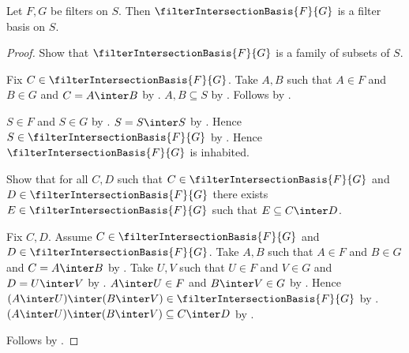 \begin{proposition}\label{filter_intersection_basis_is_filter_basis}
    Let $F,G$ be filters on $S$.
    Then $\filterIntersectionBasis{F}{G}$ is a filter basis on $S$.
\end{proposition}
\begin{proof}
    Show that $\filterIntersectionBasis{F}{G}$ is a family of subsets of $S$.
    \begin{subproof}
        Fix $C\in\filterIntersectionBasis{F}{G}$.
        Take $A,B$ such that $A\in F$ and $B\in G$ and $C=A\inter B$ by
            .
        $A,B\subseteq S$ by .
        Follows by .
    \end{subproof}
    $S\in F$ and $S\in G$ by .
    $S=S\inter S$ by .
    Hence $S\in\filterIntersectionBasis{F}{G}$ by
        .
    Hence $\filterIntersectionBasis{F}{G}$ is inhabited.

    Show that for all $C,D$ such that
        $C\in\filterIntersectionBasis{F}{G}$ and
        $D\in\filterIntersectionBasis{F}{G}$ there exists
        $E\in\filterIntersectionBasis{F}{G}$ such that $E\subseteq C\inter D$.
    \begin{subproof}
        Fix $C,D$.
        Assume $C\in\filterIntersectionBasis{F}{G}$ and
            $D\in\filterIntersectionBasis{F}{G}$.
        Take $A,B$ such that $A\in F$ and $B\in G$ and $C=A\inter B$ by
            .
        Take $U,V$ such that $U\in F$ and $V\in G$ and $D=U\inter V$ by
            .
        $A\inter U\in F$ and $B\inter V\in G$ by .
        Hence $(A\inter U)\inter(B\inter V)
            \in\filterIntersectionBasis{F}{G}$ by
            .
        $(A\inter U)\inter(B\inter V)\subseteq C\inter D$ by
            .
    \end{subproof}
    Follows by .
\end{proof}

